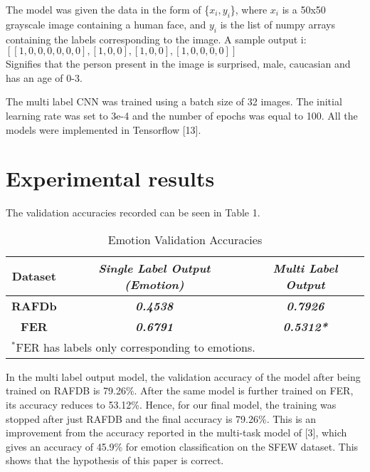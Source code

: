 \documentclass[letterpaper,10pt]{article}
\begin{document}
The model was given the data in the form of \{$x_i,y_i$\}, where $x_i$ is a 50x50 grayscale image containing a human face, and $y_i$ is the list of numpy arrays containing the labels corresponding to the image.
A sample output i:\\
$[[1, 0, 0, 0, 0, 0, 0], [1, 0, 0], [1, 0, 0],[1, 0, 0, 0, 0]]$\\
Signifies that the person present in the image is surprised, male, caucasian and has an age of 0-3.

The multi label CNN was trained using a batch size of 32 images.
The initial learning rate was set to 3e-4 and the number of epochs was equal to 100.
All the models were implemented in Tensorflow [13].

\section{Experimental results}
The validation accuracies recorded can be seen in Table 1.
\begin{table}[htbp]

\begin{center}
\begin{tabular}{|c|c|c|}

\hline

\textbf{Dataset} & \textbf{\textit{Single Label 
Output (Emotion)}}& \textbf{\textit{Multi Label 
Output}} \\
\hline
\textbf{RAFDb} & \textbf{\textit{0.4538}}& \textbf{\textit{0.7926}} \\
\hline
\textbf{FER} & \textbf{\textit{0.6791}}& \textbf{\textit{0.5312*}} \\
\hline

\multicolumn{3}{l}{$^{\mathrm{*}}$FER has labels only corresponding to emotions. 
}

\end{tabular}
\label{tab1}
\end{center}
\caption{Emotion Validation Accuracies}
\end{table}
In the multi label output model, the validation accuracy of the model after being trained on RAFDB is 79.26\%. After the same model is further trained on FER, its accuracy reduces to 53.12\%. Hence, for our final model, the training was stopped after just RAFDB and the final accuracy is 79.26\%. This is an improvement from the accuracy reported in the multi-task model of [3], which gives an accuracy of 45.9\% for emotion classification on the SFEW dataset. This shows that the hypothesis of this paper is correct.
\end{document}
